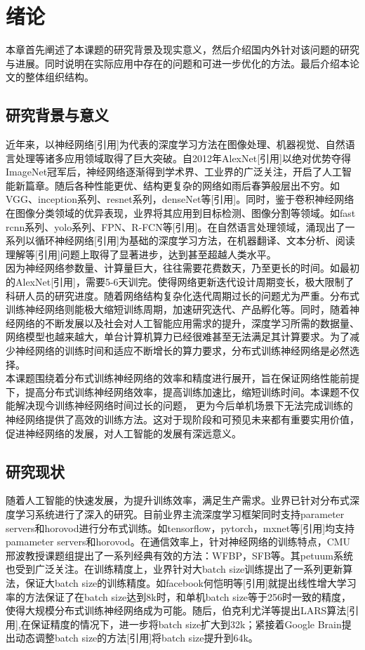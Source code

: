 \chapter{绪论}
本章首先阐述了本课题的研究背景及现实意义，然后介绍国内外针对该问题的研究与进展。同时说明在实际应用中存在的问题和可进一步优化的方法。最后介绍本论文的整体组织结构。
\section{研究背景与意义}
近年来，以神经网络[引用]为代表的深度学习方法在图像处理、机器视觉、自然语言处理等诸多应用领域取得了巨大突破。自2012年AlexNet[引用]以绝对优势夺得ImageNet冠军后，神经网络逐渐得到学术界、工业界的广泛关注，开启了人工智能新篇章。随后各种性能更优、结构更复杂的网络如雨后春笋般层出不穷。如VGG、inception系列、resnet系列，denseNet等[引用]。同时，鉴于卷积神经网络在图像分类领域的优异表现，业界将其应用到目标检测、图像分割等领域。如fast rcnn系列、yolo系列、FPN、R-FCN等[引用]。在自然语言处理领域，涌现出了一系列以循环神经网络[引用]为基础的深度学习方法，在机器翻译、文本分析、阅读理解等[引用]问题上取得了显著进步，达到甚至超越人类水平。\\
因为神经网络参数量、计算量巨大，往往需要花费数天，乃至更长的时间。如最初的AlexNet[引用]，需要5-6天训完。使得网络更新迭代设计周期变长，极大限制了科研人员的研究进度。随着网络结构复杂化迭代周期过长的问题尤为严重。分布式训练神经网络则能极大缩短训练周期，加速研究迭代、产品孵化等。同时，随着神经网络的不断发展以及社会对人工智能应用需求的提升，深度学习所需的数据量、网络模型也越来越大，单台计算机算力已经很难甚至无法满足其计算要求。为了减少神经网络的训练时间和适应不断增长的算力要求，分布式训练神经网络是必然选择。\\
本课题围绕着分布式训练神经网络的效率和精度进行展开，旨在保证网络性能前提下，提高分布式训练神经网络效率，提高训练加速比，缩短训练时间。本课题不仅能解决现今训练神经网络时间过长的问题， 更为今后单机场景下无法完成训练的神经网络提供了高效的训练方法。这对于现阶段和可预见未来都有重要实用价值，促进神经网络的发展，对人工智能的发展有深远意义。

\section{研究现状}
随着人工智能的快速发展，为提升训练效率，满足生产需求。业界已针对分布式深度学习系统进行了深入的研究。目前业界主流深度学习框架同时支持parameter servers和horovod进行分布式训练。如tensorflow，pytorch，mxnet等[引用]均支持pamameter servers和horovod。在通信效率上，针对神经网络的训练特点，CMU邢波教授课题组提出了一系列经典有效的方法：WFBP，SFB等。其petuum系统也受到广泛关注。在训练精度上，业界针对大batch size训练提出了一系列更新算法，保证大batch size的训练精度。如facebook何恺明等[引用]就提出线性增大学习率的方法保证了在batch size达到8k时，和单机batch size等于256时一致的精度，使得大规模分布式训练神经网络成为可能。随后，伯克利尤洋等提出LARS算法[引用],在保证精度的情况下，进一步将batch size扩大到32k；紧接着Google Brain提出动态调整batch size的方法[引用]将batch size提升到64k。
